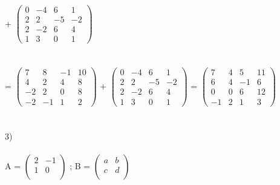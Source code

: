 \documentclass[12pt, a4paper]{article}
\begin{document}
	+
	\begin{math}
		\left(
		\begin{array}{rrrr}
			0& -4 & 6  & 1\\
			2& 2 & -5 & -2\\
			2& -2 & 6 & 4\\
			1 & 3 & 0 & 1
		\end{array}
		\right )
	\end{math}
	\\\\\\
	=
	\begin{math}
		\left(
		\begin{array}{rrrr}
			7& 8 & -1 & 10\\
			4& 2 & 4 & 8\\
			-2& 2 & 0 & 8\\
			-2 & -1 & 1 & 2
		\end{array}
		\right )
	\end{math}
	+
	\begin{math}
		\left(
		\begin{array}{rrrr}
			0& -4 & 6  & 1\\
			2& 2 & -5 & -2\\
			2& -2 & 6 & 4\\
			1 & 3 & 0 & 1
		\end{array}
		\right )
	\end{math}
	=
	\begin{math}
		\left(
		\begin{array}{rrrr}
			7&  4& 5  & 11\\
			6& 4 & -1 & 6\\
			0& 0 & 6 & 12\\
			-1 & 2 & 1 & 3
		\end{array}
		\right )
	\end{math}
	\\\\\\
	3)
	\\\\
	A = 
	\begin{math}
		\left(
		\begin{array}{rr}
			2 & -1 \\
			1 & 0 \\
		\end{array}
		\right )
	\end{math}
	; B = 
	\begin{math}
		\left(
		\begin{array}{rr}
			a & b \\
			c & d \\
		\end{array}
		\right )
	\end{math}
\end{document}
